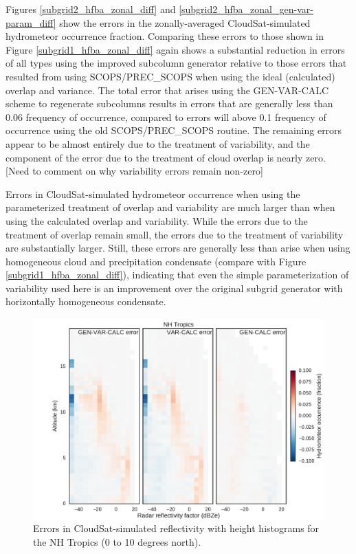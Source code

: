 Figures \ref{subgrid2_hfba_zonal_diff} and \ref{subgrid2_hfba_zonal_gen-var-param_diff} show the errors in the zonally-averaged CloudSat-simulated hydrometeor occurrence fraction. Comparing these errors to those shown in Figure \ref{subgrid1_hfba_zonal_diff} again shows a substantial reduction in errors of all types using the improved subcolumn generator relative to those errors that resulted from using SCOPS/PREC\_SCOPS when using the ideal (calculated) overlap and variance. The total error that arises using the GEN-VAR-CALC scheme to regenerate subcolumns results in errors that are generally less than 0.06 frequency of occurrence, compared to errors will above 0.1 frequency of occurrence using the old SCOPS/PREC\_SCOPS routine. The remaining errors appear to be almost entirely due to the treatment of variability, and the component of the error due to the treatment of cloud overlap is nearly zero. [Need to comment on why variability errors remain non-zero]

Errors in CloudSat-simulated hydrometeor occurrence when using the parameterized treatment of overlap and variability are much larger than when using the calculated overlap and variability. While the errors due to the treatment of overlap remain small, the errors due to the treatment of variability are substantially larger. Still, these errors are generally less than arise when using homogeneous cloud and precipitation condensate (compare with Figure \ref{subgrid1_hfba_zonal_diff}), indicating that even the simple parameterization of variability used here is an improvement over the original subgrid generator with horizontally homogeneous condensate.

\begin{figure}
\centering
\includegraphics[width=\columnwidth]{graphics/subgrid2_cfadDbze94_NHTropics_gen-var-calc_diff.pdf}
\caption{Errors in CloudSat-simulated reflectivity with height histograms for the NH Tropics (0 to 10 degrees north).}
\label{subgrid2_cfadDbze94_nhtropics_diff}
\end{figure}

